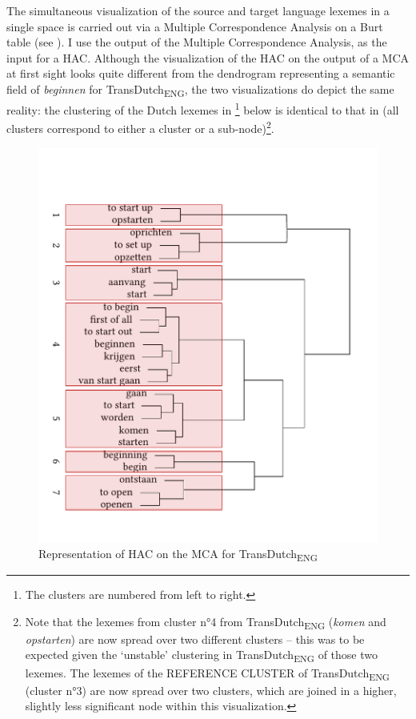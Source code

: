The simultaneous visualization of the source and target language lexemes in a single space is carried out via a Multiple Correspondence Analysis on a Burt table \citep{greenacre_simple_2006, greenacre_correspondence_2007} (see ). I use the output of the Multiple Correspondence Analysis, as the input for a HAC. Although the visualization of the HAC on the output of a MCA at first sight looks quite different from the dendrogram representing a semantic field of \textit{beginnen} for TransDutch\textsubscript{ENG}, the two visualizations do depict the same reality: the clustering of the Dutch lexemes in \footnote{The clusters are numbered from left to right.} below is identical to that in  (all clusters correspond to either a cluster or a sub-node)\footnote{Note that the lexemes from cluster n°4 from TransDutch\textsubscript{ENG} (\textit{komen} and \textit{opstarten}) are now spread over two different clusters – this was to be expected given the ‘unstable’ clustering in TransDutch\textsubscript{ENG} of those two lexemes. The lexemes of the REFERENCE CLUSTER of TransDutch\textsubscript{ENG} (cluster n°3) are now spread over two clusters, which are joined in a higher, slightly less significant node within this visualization.}.

\begin{figure}
\includegraphics[width=\textwidth]{figures/tree92.pdf}
\caption{\label{fig:4:89}  Representation of HAC on the MCA for TransDutch\textsubscript{ENG}}
\end{figure}

